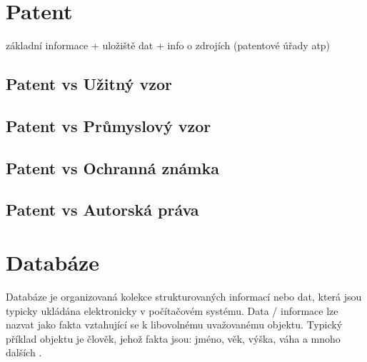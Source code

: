 \chapter{Patent}
základní informace + uložiště dat + info o zdrojích (patentové úřady atp) \newline
\section{Patent vs Užitný vzor}
\section{Patent vs Průmyslový vzor}
\section{Patent vs Ochranná známka}
\section{Patent vs Autorská práva}



\chapter{Databáze}

Databáze je organizovaná kolekce strukturovaných informací nebo dat, která jsou typicky ukládána elektronicky v počítačovém systému. Data / informace lze nazvat jako fakta vztahující se k libovolnému uvažovanému objektu. Typický příklad objektu je člověk, jehož fakta jsou: jméno, věk, výška, váha a mnoho dalších \cite{guru99Database}.\newline

